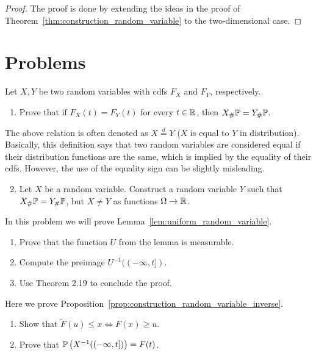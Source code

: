 \begin{proof}
The proof is done by extending the ideas in the proof of Theorem~\ref{thm:construction_random_variable} to the two-dimensional case. %
\end{proof}

\section{Problems}

\begin{problem}
Let $X,Y$ be two random variables with cdfs $F_X$ and $F_Y$, respectively. 
\begin{enumerate}[label=(\alph*)]
\item Prove that if $F_X(t) = F_Y(t)$ for every $t \in \mathbb R$, then $X_\# \mathbb P = Y_\# \mathbb P$. 
\end{enumerate}
The above relation is often denoted as $X \stackrel{d}{=} Y$ ($X$ is equal to $Y$ in distribution). Basically, this definition says that two random variables are considered equal if their distribution functions are the same, which is implied by the equality of their cdfs. However, the use of the equality sign can be slightly misleading.
\begin{enumerate}[label=(\alph*)]
\setcounter{enumi}{1}
\item Let $X$ be a random variable. Construct a random variable $Y$ such that $X_\# \mathbb P = Y_\# \mathbb P$, but $X \ne Y$ as functions $\Omega \to \mathbb R$.
\end{enumerate}
\end{problem}

\begin{problem}\label{prb:construction_uniform_rv}
In this problem we will prove Lemma~\ref{lem:uniform_random_variable}. 
\begin{enumerate}[label=(\alph*)]
\item Prove that the function $U$ from the lemma is measurable.
\item Compute the preimage $U^{-1}((-\infty, t])$.
\item Use Theorem 2.19 to conclude the proof.
\end{enumerate}
\end{problem}

\begin{problem}\label{prb:construction_random_variable_inverse}
Here we prove Proposition~\ref{prop:construction_random_variable_inverse}. 
\begin{enumerate}[label=(\alph*)]
\item Show that $\overleftarrow{F}(u) \le x \iff F(x) \ge u$.
\item Prove that $\mathbb P\left(X^{-1}((-\infty,t])\right) = F(t)$.
\end{enumerate}
\end{problem}

